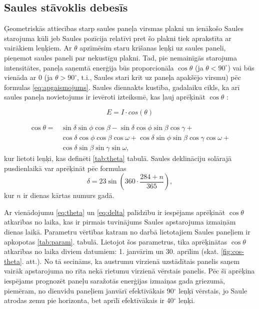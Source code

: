 
\subsection{Saules stāvoklis debesīs}

Ģeometriskās attiecības starp saules paneļa virsmas plakni un ienākošo Saules starojuma kūli jeb Saules pozīcija relatīvi pret šo plakni tiek aprakstīta ar vairākiem leņķiem. Ar $\theta$ apzīmēsim staru krišanas leņķi uz saules paneli, pieņemot saules paneli par nekustīgu plakni. Tad, pie nemainīgās starojuma intensitātes, paneļa saņemtā enerģija būs proporcionāla $\cos{\theta}$ (ja $\theta<90^\circ$) vai būs vienāda ar 0 (ja $\theta>90^\circ$, t.i., Saules stari krīt uz paneļa apakšējo virsmu) pēc formulas \ref{eq:apgaismojums}. Saules diennakts kustība, gadalaiku cikls, ka arī saules paneļa novietojums ir ievēroti izteiksmē, kas ļauj aprēķināt $\cos{\theta}$ \cite{ThermalProcesses}:

\begin{equation}
\label{eq:apgaismojums}
E = I \cdot cos(\theta)
\end{equation}

\begin{equation}
\label{eq:theta}
\begin{aligned}
	\cos{\theta} = {} & \sin{\delta} \sin{\phi} \cos{\beta} - \sin{\delta} \cos{\phi} \sin{\beta} \cos{\gamma} +                           \\
	                  & \cos{\delta} \cos{\phi} \cos{\beta} \cos{\omega} + \cos{\delta} \sin{\phi} \sin{\beta} \cos{\gamma} \cos{\omega} + \\
	                  & \cos{\delta} \sin{\beta} \sin{\gamma} \sin{\omega},
\end{aligned}
\end{equation}
kur lietoti leņķi, kas definēti \ref{tab:theta} tabulā. Saules deklināciju solārajā pusdienlaikā var aprēķināt pēc formulas
\begin{equation}
\label{eq:delta}
    \delta = 23 \sin \left( 360 \cdot \frac{284+n}{365} \right),
\end{equation}
kur $n$ ir dienas kārtas numurs gadā.

Ar vienādojumu \ref{eq:theta} un \ref{eq:delta} palīdzību ir iespējams aprēķināt $\cos{\theta}$ atkarības no laika, kas ir pirmais tuvinājums Saules apstarojuma izmaiņām dienas laikā.
Parametru vērtības katram no darbā lietotajiem Saules paneļiem ir apkopotas \ref{tab:param}. tabulā.
Lietojot šos parametrus, tika aprēķinātas $\cos{\theta}$ atkarības no laika diviem datumiem: 1. janvārim un 30. aprīlim (skat. \ref{fig:cos-theta}. att.). No tā secināms, ka austrumu virzienā uzstādītais panelis saņem vairāk apstarojuma no rīta nekā rietumu virzienā vērstais panelis. Pēc šī aprēķina iespējams prognozēt paneļu saražotās enerģijas izmaiņas gada griezumā, piemēram, no dienvidu paneļiem janvārī efektīvākais 90$^\circ$ leņķī vērstais, jo Saule atrodas zemu pie horizonta, bet aprīlī efektīvākais ir 40$^\circ$ leņķi.

